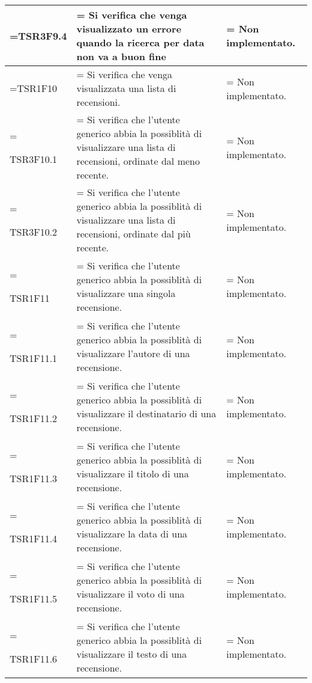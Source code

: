\begin{xltabular}{\textwidth} {
        >{\hsize\linewidth=\hsize}X
        >{\hsize\linewidth=\hsize}X
        >{\hsize\linewidth=\hsize}X
    }
    TSR3F9.4&
    Si verifica che venga visualizzato un errore quando la ricerca per data non va a buon fine &
    Non implementato.
    \\ \hline

    TSR1F10&
    Si verifica che venga visualizzata una lista di recensioni. &
    Non implementato.
    \\ \hline
    

    TSR3F10.1 &
    Si verifica che l'utente generico abbia la possiblità di visualizzare una lista di recensioni,
    ordinate dal meno recente.  &
    Non implementato.
    \\ \hline

    TSR3F10.2 &
    Si verifica che l'utente generico abbia la possiblità di visualizzare una lista di recensioni,
    ordinate dal più recente.  &
    Non implementato.
    \\ \hline

    TSR1F11 &
    Si verifica che l'utente generico abbia la possiblità di visualizzare una singola recensione.  &
    Non implementato.
    \\ \hline
    
    TSR1F11.1 &
    Si verifica che l'utente generico abbia la possiblità di visualizzare l'autore di una recensione.  &
    Non implementato.
    \\ \hline
    
    TSR1F11.2 &
    Si verifica che l'utente generico abbia la possiblità di visualizzare il destinatario di una recensione.  &
    Non implementato.
    \\ \hline

    TSR1F11.3 &
    Si verifica che l'utente generico abbia la possiblità di visualizzare il titolo di una recensione.  &
    Non implementato.
    \\ \hline

    TSR1F11.4 &
    Si verifica che l'utente generico abbia la possiblità di visualizzare la data di una recensione.  &
    Non implementato.
    \\ \hline

    TSR1F11.5 &
    Si verifica che l'utente generico abbia la possiblità di visualizzare il voto di una recensione.  &
    Non implementato.
    \\ \hline

    TSR1F11.6 &
    Si verifica che l'utente generico abbia la possiblità di visualizzare il testo di una recensione.  &
    Non implementato.
    \\ \hline


\end{xltabular}
